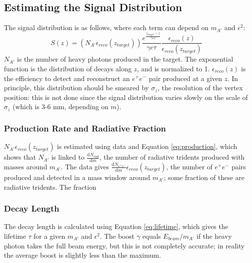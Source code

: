 \subsection{Estimating the Signal Distribution}
\label{sec:signal_shape}
The signal distribution is as follows, where each term can depend on $m_{A'}$ and $\epsilon^2$:
\begin{equation}
S(z) = (N_{A'}\epsilon_{reco}(z_{target}))\frac{e^{\frac{z_{target}-z}{\gamma c \tau}}}{\gamma c \tau}\frac{\epsilon_{reco}(z)}{\epsilon_{reco}(z_{target})}
\end{equation}
$N_{A'}$ is the number of heavy photons produced in the target.
The exponential function is the distribution of decays along $z$, and is normalized to 1.
$\epsilon_{reco}(z)$ is the efficiency to detect and reconstruct an $e^+e^-$ pair produced at a given $z$.
In principle, this distribution should be smeared by $\sigma_z$, the resolution of the vertex position: this is not done since the signal distribution varies slowly on the scale of $\sigma_z$ (which is 3-6 mm, depending on $m$).



\subsubsection{Production Rate and Radiative Fraction}

$N_{A'}\epsilon_{reco}(z_{target})$ is estimated using data and Equation \ref{eq:production}, which shows that $N_{A'}$ is linked to $\frac{\mathrm{d}N_{rad}}{\mathrm{d}m}$, the number of radiative tridents produced with masses around $m_{A'}$.
The data gives $\frac{\mathrm{d}N_{e^+e^-}}{\mathrm{d}m}\epsilon_{reco}(z_{target})$, the number of $e^+e^-$ pairs produced and detected in a mass window around $m_{A'}$; some fraction of these are radiative tridents.
The fraction 

\subsubsection{Decay Length}
The decay length is calculated using Equation \ref{eq:lifetime}, which gives the lifetime $\tau$ for a given $m_{A'}$ and $\epsilon^2$.
The boost $\gamma$ equals $E_{beam}/m_{A'}$ if the heavy photon takes the full beam energy, but this is not completely accurate; in reality the average boost is slightly less than the maximum.

